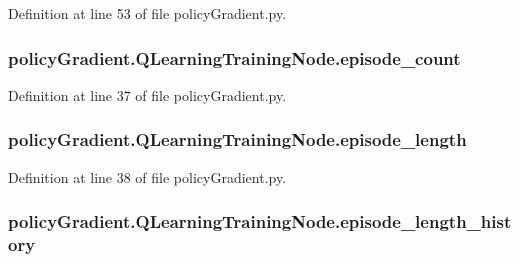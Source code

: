 Definition at line 53 of file policy\+Gradient.\+py.

\subsubsection[{\texorpdfstring{episode\+\_\+count}{episode_count}}]{\setlength{\rightskip}{0pt plus 5cm}policy\+Gradient.\+Q\+Learning\+Training\+Node.\+episode\+\_\+count}\hypertarget{classpolicy_gradient_1_1_q_learning_training_node_ac869946fea336c443892b770981153ee}{}\label{classpolicy_gradient_1_1_q_learning_training_node_ac869946fea336c443892b770981153ee}


Definition at line 37 of file policy\+Gradient.\+py.

\subsubsection[{\texorpdfstring{episode\+\_\+length}{episode_length}}]{\setlength{\rightskip}{0pt plus 5cm}policy\+Gradient.\+Q\+Learning\+Training\+Node.\+episode\+\_\+length}\hypertarget{classpolicy_gradient_1_1_q_learning_training_node_a5773373ab6f9f944499f1d296b37e7bc}{}\label{classpolicy_gradient_1_1_q_learning_training_node_a5773373ab6f9f944499f1d296b37e7bc}


Definition at line 38 of file policy\+Gradient.\+py.

\subsubsection[{\texorpdfstring{episode\+\_\+length\+\_\+history}{episode_length_history}}]{\setlength{\rightskip}{0pt plus 5cm}policy\+Gradient.\+Q\+Learning\+Training\+Node.\+episode\+\_\+length\+\_\+history}\hypertarget{classpolicy_gradient_1_1_q_learning_training_node_ab0b18966b84de1da395803f2b578a505}{}\label{classpolicy_gradient_1_1_q_learning_training_node_ab0b18966b84de1da395803f2b578a505}


